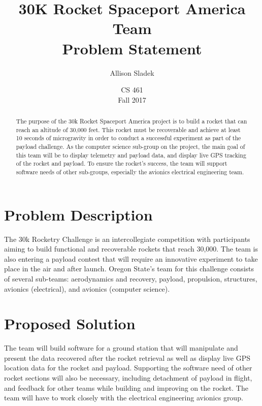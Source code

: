\documentclass[10pt, letterpaper, twoside, onecolumn]{article}
\title{30K Rocket Spaceport America Team \\Problem Statement}
\author{Allison Sladek}
\date{CS 461\\Fall 2017
}
\begin{document}
\begin{titlepage}
\maketitle

\begin{abstract}
The purpose of the 30k Rocket Spaceport America project is to build a rocket that can reach an altitude of 30,000 feet. This rocket must be recoverable and achieve at least 10 seconds of microgravity in order to conduct a successful experiment as part of the payload challenge. As the computer science sub-group on the project, the main goal of this team will be to display telemetry and payload data, and display live GPS tracking of the rocket and payload. To ensure the rocket’s success, the team will support software needs of other sub-groups, especially the avionics electrical engineering team.
\end{abstract}


\end{titlepage}


\section{Problem Description}

The 30k Rocketry Challenge is an intercollegiate competition with participants aiming to build functional and recoverable rockets that reach 30,000. The team is also entering a payload contest that will require an innovative experiment to take place in the air and after launch. Oregon State’s team for this challenge consists of several sub-teams: aerodynamics and recovery, payload, propulsion, structures, avionics (electrical), and avionics (computer science).

\section{Proposed Solution}

The team will build software for a ground station that will manipulate and present the data recovered after the rocket retrieval as well as display live GPS location data for the rocket and payload. Supporting the software need of other rocket sections will also be necessary, including detachment of payload in flight, and feedback for other teams while building and improving on the rocket. The team will have to work closely with the electrical engineering avionics group.
\end{document}
